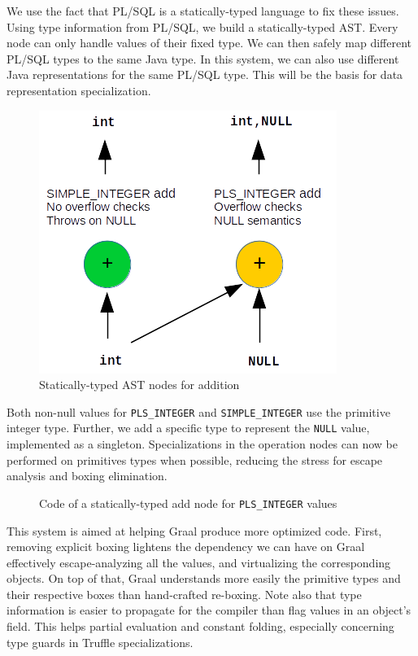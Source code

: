 \documentclass[twoside,11pt,a4paper]{article}
\newcommand{\pls}[1]{\small\texttt{#1}\normalsize}
\newcommand{\plstype}[1]{\pls{#1}}
\newcommand{\plsi}{\plstype{PLS\_INTEGER}}
\newcommand{\simpleint}{\plstype{SIMPLE\_INTEGER}}
\newcommand{\plsnull}{\pls{NULL}}
\begin{document}
We use the fact that PL/SQL is a statically-typed language to fix these issues. Using type information from PL/SQL, we build a statically-typed AST. Every node can only handle values of their fixed type. We can then safely map different PL/SQL types to the same Java type. In this system, we can also use different Java representations for the same PL/SQL type. This will be the basis for data representation specialization.

\begin{figure}[p]
	\centering
	\includegraphics[scale=0.8]{./graphs/TypedNodeExample.png}
	\caption{Statically-typed AST nodes for addition}
	\label{fig:typednodeexample}
\end{figure}

Both non-null values for \plsi{} and \simpleint{} use the primitive integer type. Further, we add a specific type to represent the \plsnull{} value, implemented as a singleton. Specializations in the operation nodes can now be performed on primitives types when possible, reducing the stress for escape analysis and boxing elimination.

\begin{figure}[p]
	
	\caption{Code of a statically-typed add node for \plsi{} values}
	\label{fig:plsiadd}
\end{figure}

This system is aimed at helping Graal produce more optimized code. First, removing explicit boxing lightens the dependency we can have on Graal effectively escape-analyzing all the values, and virtualizing the corresponding objects. On top of that, Graal understands more easily the primitive types and their respective boxes than hand-crafted re-boxing. Note also that type information is easier to propagate for the compiler than flag values in an object's field. This helps partial evaluation and constant folding, especially concerning type guards in Truffle specializations.
\end{document}

